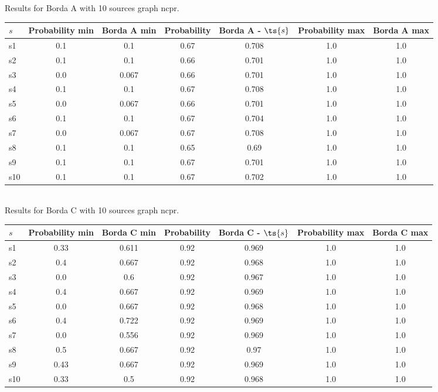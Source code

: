 \documentclass{article}
\begin{document}
\noindent Results for Borda A with 10 sources graph ncpr.

\noindent\begin{tabular}{|l|c|c|c|c|c|c|}
\hline
$s$& Probability min & Borda A min & Probability & Borda A - $\ts{s}$ & Probability max & Borda A max\\
\hline
s1 &0.1 & 0.1 & 0.67 & 0.708 & 1.0 & 1.0\\
\hline
s2 &0.1 & 0.1 & 0.66 & 0.701 & 1.0 & 1.0\\
\hline
s3 &0.0 & 0.067 & 0.66 & 0.701 & 1.0 & 1.0\\
\hline
s4 &0.1 & 0.1 & 0.67 & 0.708 & 1.0 & 1.0\\
\hline
s5 &0.0 & 0.067 & 0.66 & 0.701 & 1.0 & 1.0\\
\hline
s6 &0.1 & 0.1 & 0.67 & 0.704 & 1.0 & 1.0\\
\hline
s7 &0.0 & 0.067 & 0.67 & 0.708 & 1.0 & 1.0\\
\hline
s8 &0.1 & 0.1 & 0.65 & 0.69 & 1.0 & 1.0\\
\hline
s9 &0.1 & 0.1 & 0.67 & 0.701 & 1.0 & 1.0\\
\hline
s10 &0.1 & 0.1 & 0.67 & 0.702 & 1.0 & 1.0\\
\hline
\end{tabular}\\

\noindent Results for Borda C with 10 sources graph ncpr.

\noindent\begin{tabular}{|l|c|c|c|c|c|c|}
\hline
$s$& Probability min & Borda C min & Probability & Borda C - $\ts{s}$ & Probability max & Borda C max\\
\hline
s1 &0.33 & 0.611 & 0.92 & 0.969 & 1.0 & 1.0\\
\hline
s2 &0.4 & 0.667 & 0.92 & 0.968 & 1.0 & 1.0\\
\hline
s3 &0.0 & 0.6 & 0.92 & 0.967 & 1.0 & 1.0\\
\hline
s4 &0.4 & 0.667 & 0.92 & 0.969 & 1.0 & 1.0\\
\hline
s5 &0.0 & 0.667 & 0.92 & 0.968 & 1.0 & 1.0\\
\hline
s6 &0.4 & 0.722 & 0.92 & 0.969 & 1.0 & 1.0\\
\hline
s7 &0.0 & 0.556 & 0.92 & 0.969 & 1.0 & 1.0\\
\hline
s8 &0.5 & 0.667 & 0.92 & 0.97 & 1.0 & 1.0\\
\hline
s9 &0.43 & 0.667 & 0.92 & 0.969 & 1.0 & 1.0\\
\hline
s10 &0.33 & 0.5 & 0.92 & 0.968 & 1.0 & 1.0\\
\hline
\end{tabular}\\
\end{document}
